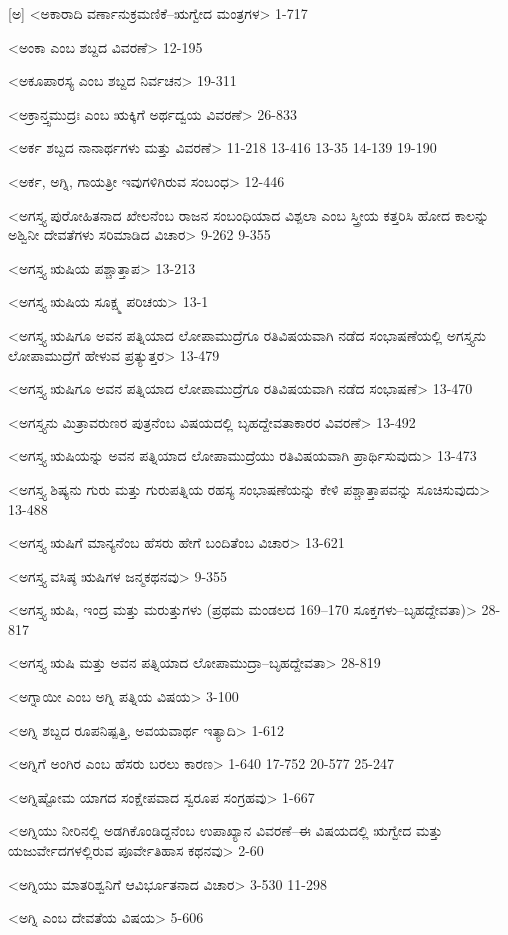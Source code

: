 [ಅ]
<ಅಕಾರಾದಿ ವರ್ಣಾನುಕ್ರಮಣಿಕೆ–ಋಗ್ವೇದ ಮಂತ್ರಗಳ>
1-717

<ಅಂಕಾ ಎಂಬ ಶಬ್ದದ ವಿವರಣೆ>
12-195

<ಅಕೂಪಾರಸ್ಯ ಎಂಬ ಶಬ್ದದ ನಿರ್ವಚನ>
19-311

<ಅಕ್ರಾನ್ತ್ಸಮುದ್ರಃ ಎಂಬ ಋಕ್ಕಿಗೆ ಅರ್ಥದ್ವಯ ವಿವರಣೆ>
26-833

<ಅರ್ಕ ಶಬ್ದದ ನಾನಾರ್ಥಗಳು ಮತ್ತು ವಿವರಣೆ>
11-218 
13-416 
13-35 
14-139 
19-190

<ಅರ್ಕ, ಅಗ್ನಿ, ಗಾಯತ್ರೀ ಇವುಗಳಿಗಿರುವ ಸಂಬಂಧ>
12-446

<ಅಗಸ್ತ್ಯ ಪುರೋಹಿತನಾದ ಖೇಲನೆಂಬ ರಾಜನ ಸಂಬಂಧಿಯಾದ ವಿಶ್ಪಲಾ ಎಂಬ ಸ್ತ್ರೀಯ ಕತ್ತರಿಸಿ ಹೋದ ಕಾಲನ್ನು ಅಶ್ವಿನೀ ದೇವತೆಗಳು ಸರಿಮಾಡಿದ ವಿಚಾರ>
9-262 
9-355

<ಅಗಸ್ತ್ಯ ಋಷಿಯ ಪಶ್ಚಾತ್ತಾಪ>
13-213

<ಅಗಸ್ತ್ಯ ಋಷಿಯ ಸೂಕ್ಷ್ಮ ಪರಿಚಯ>
13-1

<ಅಗಸ್ತ್ಯ ಋಷಿಗೂ ಅವನ ಪತ್ನಿಯಾದ ಲೋಪಾಮುದ್ರೆಗೂ ರತಿವಿಷಯವಾಗಿ ನಡೆದ ಸಂಭಾಷಣೆಯಲ್ಲಿ ಅಗಸ್ತ್ಯನು ಲೋಪಾಮುದ್ರೆಗೆ ಹೇಳುವ ಪ್ರತ್ಯುತ್ತರ>
13-479

<ಅಗಸ್ತ್ಯ ಋಷಿಗೂ ಅವನ ಪತ್ನಿಯಾದ ಲೋಪಾಮುದ್ರೆಗೂ ರತಿವಿಷಯವಾಗಿ ನಡೆದ ಸಂಭಾಷಣೆ>
13-470

<ಅಗಸ್ತ್ಯನು ಮಿತ್ರಾವರುಣರ ಪುತ್ರನೆಂಬ ವಿಷಯದಲ್ಲಿ ಬೃಹದ್ದೇವತಾಕಾರರ ವಿವರಣೆ>
13-492

<ಅಗಸ್ತ್ಯ ಋಷಿಯನ್ನು ಅವನ ಪತ್ನಿಯಾದ ಲೋಪಾಮುದ್ರೆಯು ರತಿವಿಷಯವಾಗಿ ಪ್ರಾರ್ಥಿಸುವುದು>
13-473

<ಅಗಸ್ತ್ಯ ಶಿಷ್ಯನು ಗುರು ಮತ್ತು ಗುರುಪತ್ನಿಯ ರಹಸ್ಯ ಸಂಭಾಷಣೆಯನ್ನು ಕೇಳಿ ಪಶ್ಚಾತ್ತಾಪವನ್ನು ಸೂಚಿಸುವುದು>
13-488

<ಅಗಸ್ತ್ಯ ಋಷಿಗೆ ಮಾನ್ಯನೆಂಬ ಹೆಸರು ಹೇಗೆ ಬಂದಿತೆಂಬ ವಿಚಾರ>
13-621

<ಅಗಸ್ತ್ಯ ವಸಿಷ್ಠ ಋಷಿಗಳ ಜನ್ಮಕಥನವು>
9-355

<ಅಗಸ್ತ್ಯ ಋಷಿ, ಇಂದ್ರ ಮತ್ತು ಮರುತ್ತುಗಳು (ಪ್ರಥಮ ಮಂಡಲದ  169–170 ಸೂಕ್ತಗಳು–ಬೃಹದ್ದೇವತಾ)>
28-817

<ಅಗಸ್ತ್ಯ ಋಷಿ ಮತ್ತು ಅವನ ಪತ್ನಿಯಾದ ಲೋಪಾಮುದ್ರಾ–ಬೃಹದ್ದೇವತಾ>
28-819

<ಅಗ್ನಾಯೀ ಎಂಬ ಅಗ್ನಿ ಪತ್ನಿಯ ವಿಷಯ>
3-100

<ಅಗ್ನಿ ಶಬ್ದದ ರೂಪನಿಷ್ಪತ್ತಿ, ಅವಯವಾರ್ಥ ಇತ್ಯಾದಿ>
1-612

<ಅಗ್ನಿಗೆ ಅಂಗಿರ ಎಂಬ ಹೆಸರು ಬರಲು ಕಾರಣ>
1-640 
17-752 
20-577 
25-247

<ಅಗ್ನಿಷ್ಟೋಮ ಯಾಗದ ಸಂಕ್ಷೇಪವಾದ ಸ್ವರೂಪ ಸಂಗ್ರಹವು>
1-667

<ಅಗ್ನಿಯು ನೀರಿನಲ್ಲಿ ಅಡಗಿಕೊಂಡಿದ್ದನೆಂಬ ಉಪಾಖ್ಯಾನ ವಿವರಣೆ–ಈ ವಿಷಯದಲ್ಲಿ ಋಗ್ವೇದ ಮತ್ತು ಯಜುರ್ವೇದಗಳಲ್ಲಿರುವ ಪೂರ್ವೇತಿಹಾಸ ಕಥನವು>
2-60

<ಅಗ್ನಿಯು ಮಾತರಿಶ್ವನಿಗೆ ಆವಿರ್ಭೂತನಾದ ವಿಚಾರ>
3-530 
11-298

<ಅಗ್ನಿ ಎಂಬ ದೇವತೆಯ ವಿಷಯ>
5-606

